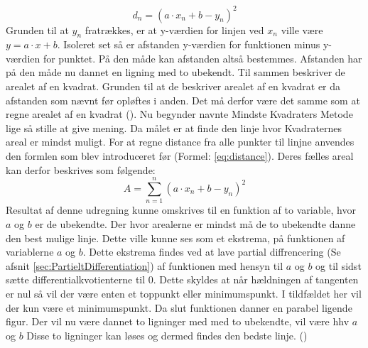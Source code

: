 \begin{equation}\label{eq:distance}
    d_n = (a \cdot x_n + b - y_n)^2 
\end{equation} Grunden til at $y_n$ fratrækkes, er at y-værdien for linjen ved $x_n$ ville være $y = a \cdot x + b$. Isoleret set så er afstanden y-værdien for funktionen minus y-værdien for punktet. På den måde kan afstanden altså bestemmes. Afstanden har på den måde nu dannet en ligning med to ubekendt. Til sammen beskriver de arealet af en kvadrat. Grunden til at de beskriver arealet af en kvadrat er da afstanden som nævnt før opløftes i anden. Det må derfor være det samme som at regne arealet af en kvadrat (\cite{Bentzen2014}). Nu begynder navnte Mindste Kvadraters Metode lige så stille at give mening. Da målet er at finde den linje hvor Kvadraternes areal er mindst muligt. For at regne distance fra alle punkter til linjne anvendes den formlen som blev introduceret før (Formel: \ref{eq:distance}). Deres fælles areal kan derfor beskrives som følgende:
\begin{equation}\label{eq:formularForDistanceForAllDataPoints}A = \sum_{n=1}^n (a \cdot x_n + b - y_n)^2\end{equation}
Resultat af denne udregning kunne omskrives til en funktion af to variable, hvor $a$ og $b$ er de ubekendte. Der hvor arealerne er mindst må de to ubekendte danne den best mulige linje. Dette ville kunne ses som et ekstrema, på funktionen af variablerne $a$ og $b$. Dette ekstrema findes ved at lave partial diffrencering (Se afsnit \ref{sec:PartieltDifferentiation}) af funktionen med hensyn til $a$ og $b$ og til sidst sætte differentialkvotienterne til 0. Dette skyldes at når hældningen af tangenten er nul så vil der være enten et toppunkt eller minimumspunkt. I tildfældet her vil der kun være et minimumspunkt. Da slut funktionen danner en parabel ligende figur. Der vil nu være dannet to ligninger med med to ubekendte, vil være hhv $a$ og $b$ Disse to ligninger kan løses og dermed findes den bedste linje. (\cite{webmatematikMindsteKvadratersMetode})



